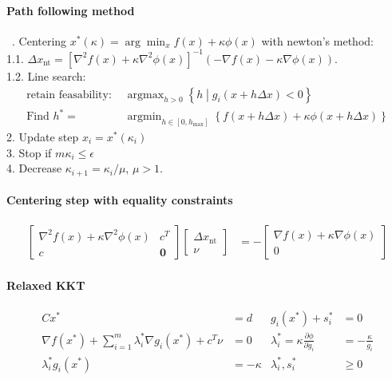 \documentclass[landscape,a4paper,8pt]{scrartcl}
\newcommand{\Me}[1]{\begin{bmatrix}#1\end{bmatrix}} %
\DeclareMathOperator\argmin{argmin}
\DeclareMathOperator\argmax{argmax}
\begin{document}
\begin{multicols*}{3}
\paragraph{Path following method} \ . Centering 
$x^*(\kappa) = \arg\min_x f(x) + \kappa\phi(x)$ with newton's method: \\
1.1. $\Delta x_\text{nt} = \left[\nabla^2 f(x) + \kappa \nabla^2\phi(x)\right]^{-1}(-\nabla f(x) - \kappa \nabla \phi(x))$. \\
1.2. Line search:
\begin{align*}
\text{retain feasability: } & \argmax_{h > 0} \left\{ h \middle| g_i(x+h\Delta x) < 0 \right\} \\
\text{Find } h^* = & \argmin_{h\in[0,h_\text{max}]} \left\{ f(x+h\Delta x) + \kappa\phi(x+h\Delta x) \right\}
\end{align*}
2. Update step $x_i = x^*(\kappa_i)$ \\
3. Stop if $m\kappa_i \leq \epsilon$ \\
4. Decrease $\kappa_{i+1} = \kappa_{i}/\mu$, $\mu > 1$.

\paragraph{Centering step with equality constraints}
\begin{align*}
\Me{\nabla^2 f(x) + \kappa \nabla^2\phi(x) & c^T \\ c & \bm 0} \Me{\Delta x_\text{nt} \\ \nu} & = -\Me{\nabla f(x) + \kappa\nabla\phi(x) \\ 0}
\end{align*}

\paragraph{Relaxed KKT}
\begin{align*}
Cx^* & = d & g_i(x^*) + s_i^* & = 0 \\
\nabla f(x^*) + \sum_{i=1}^{m} \lambda_i^*\nabla g_i(x^*) + c^T \nu & = 0 & \lambda_i^* = \kappa\frac{\partial\phi}{\partial g_i} & = -\frac{\kappa}{g_i} \\
\lambda_i^*g_i(x^*) & = - \kappa & \lambda_i^*, s_i^* & \geq 0
\end{align*}


\end{multicols*}
\end{document}
